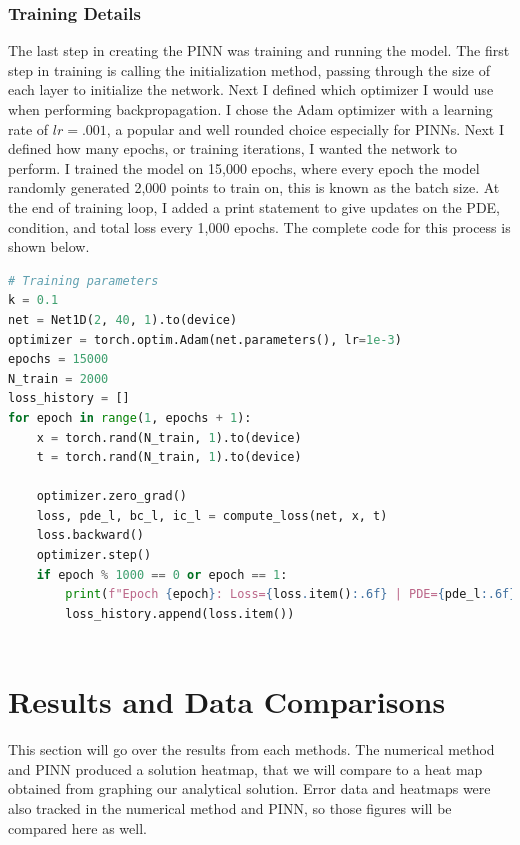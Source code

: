 \documentclass[12pt, reqno]{amsart}
\begin{document}
\subsubsection{Training Details}
The last step in creating the PINN was training and running the model. The first step in training is calling the initialization method, passing through the size of each layer to initialize the network. Next I defined which optimizer I would use when performing backpropagation. I chose the Adam optimizer with a learning rate of $lr = .001$, a popular and well rounded choice especially for PINNs. Next I defined how many epochs, or training iterations, I wanted the network to perform. I trained the model on 15,000 epochs, where every epoch the model randomly generated 2,000 points to train on, this is known as the batch size. At the end of training loop, I added a print statement to give updates on the PDE, condition, and total loss every 1,000 epochs. The complete code for this process is shown below. 
\begin{lstlisting}[language = python, title = Training paramaters and loop]
# Training parameters
k = 0.1
net = Net1D(2, 40, 1).to(device)
optimizer = torch.optim.Adam(net.parameters(), lr=1e-3)
epochs = 15000
N_train = 2000
loss_history = []
for epoch in range(1, epochs + 1):
    x = torch.rand(N_train, 1).to(device)
    t = torch.rand(N_train, 1).to(device)

    optimizer.zero_grad()
    loss, pde_l, bc_l, ic_l = compute_loss(net, x, t)
    loss.backward()
    optimizer.step()
    if epoch % 1000 == 0 or epoch == 1:
        print(f"Epoch {epoch}: Loss={loss.item():.6f} | PDE={pde_l:.6f}, BC={bc_l:.6f}, IC={ic_l:.6f}")
        loss_history.append(loss.item())
    
\end{lstlisting}



\section{Results and Data Comparisons}
This section will go over the results from each methods. The numerical method and PINN produced a solution heatmap, that we will compare to a heat map obtained from graphing our analytical solution. Error data and heatmaps were also tracked in the numerical method and PINN, so those figures will be compared here as well.
\end{document}

